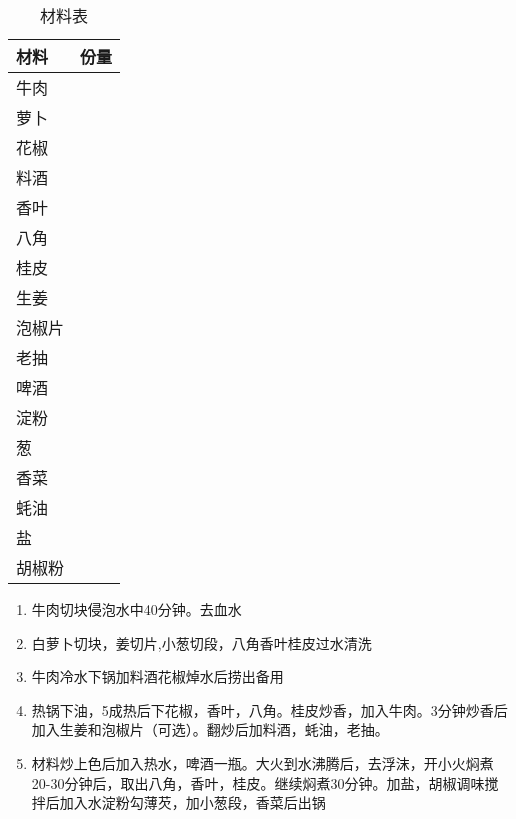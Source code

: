 \begin{table}[H]
    \centering
    \begin{tabular}{|l||c|}\hline
     \textbf{材料}    &  \textbf{份量}\\ \hline\hline
    牛肉 &  \\ \hline
    萝卜 &   \\ \hline
    花椒 & \\ \hline
    料酒 & \\ \hline
    香叶 & \\ \hline
    八角 & \\ \hline
    桂皮 & \\ \hline
    生姜 & \\ \hline
    泡椒片 & \\ \hline
    老抽 & \\ \hline
    啤酒 & \\ \hline
    淀粉 & \\ \hline
    葱 & \\ \hline
    香菜 & \\ \hline
    蚝油 & \\ \hline
    盐 & \\ \hline
    胡椒粉 & \\ \hline
    \end{tabular}
    \caption{材料表}
\end{table}

\begin{enumerate}
    \item 牛肉切块侵泡水中40分钟。去血水
    \item 白萝卜切块，姜切片,小葱切段，八角香叶桂皮过水清洗
    \item 牛肉冷水下锅加料酒花椒焯水后捞出备用
    \item 热锅下油，5成热后下花椒，香叶，八角。桂皮炒香，加入牛肉。3分钟炒香后加入生姜和泡椒片（可选）。翻炒后加料酒，蚝油，老抽。
    \item 材料炒上色后加入热水，啤酒一瓶。大火到水沸腾后，去浮沫，开小火焖煮20-30分钟后，取出八角，香叶，桂皮。继续焖煮30分钟。加盐，胡椒调味搅拌后加入水淀粉勾薄芡，加小葱段，香菜后出锅
\end{enumerate}